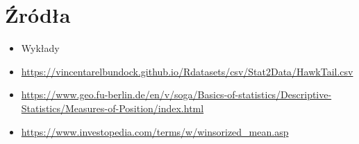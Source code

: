 \documentclass{article}
\theoremstyle{break}
\begin{document}
	\section{Źródła}
	\begin{itemize}
		\item Wykłady
		\item \url{https://vincentarelbundock.github.io/Rdatasets/csv/Stat2Data/HawkTail.csv}
		\item \url{https://www.geo.fu-berlin.de/en/v/soga/Basics-of-statistics/Descriptive-Statistics/Measures-of-Position/index.html}
		\item \url{https://www.investopedia.com/terms/w/winsorized_mean.asp}
	\end{itemize}
	
	
\end{document}
